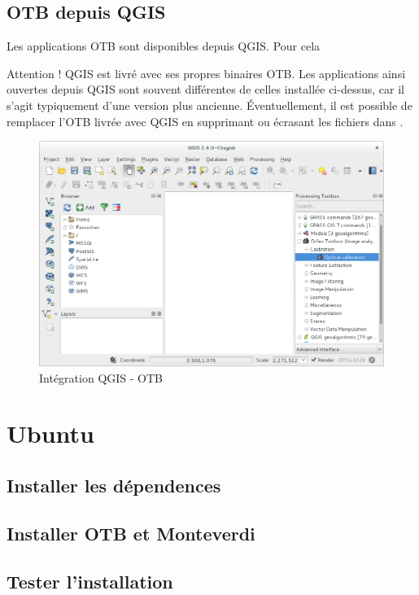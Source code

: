 \documentclass[10pt,a4paper]{article}
\begin{document}
\subsection{OTB depuis QGIS}

Les applications OTB sont disponibles depuis QGIS. Pour cela

Attention ! QGIS est livré avec ses propres binaires OTB. Les applications ainsi
ouvertes depuis QGIS sont souvent différentes de celles installée ci-dessus, car
il s'agit typiquement d'une version plus ancienne.
Éventuellement, il est possible de remplacer l'OTB livrée avec QGIS en supprimant
ou écrasant les fichiers dans \texttt{}.

\begin{figure}[h]
  \center
  \includegraphics[width=1\textwidth]{Art/qgis-otb.png}
  \caption[]{Intégration QGIS - OTB}
  \label{fig:otb-qgis}
\end{figure}

\clearpage
\section{Ubuntu}

\subsection{Installer les dépendences}

\subsection{Installer OTB et Monteverdi}

\subsection{Tester l'installation}
\end{document}
